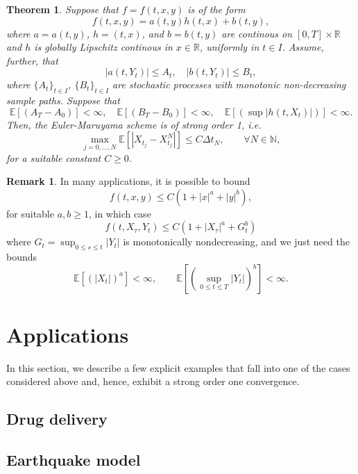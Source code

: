 \documentclass[reqno,12pt]{amsart}
\theoremstyle{plain}%
\newtheorem{thm}{Theorem}[section]
\theoremstyle{definition}
\newtheorem{rmk}{Remark}[section]
\begin{document}
\begin{thm}
  Suppose that $f=f(t, x, y)$ is of the form
  \begin{equation}
    \label{lineareqform}
    f(t, x, y) = a(t, y)h(t, x) + b(t, y),
  \end{equation}
  where $a=a(t, y)$, $h=(t, x)$, and $b=b(t, y)$ are continous on $[0, T]\times \mathbb{R}$ and $h$ is globally Lipschitz continous in $x\in\mathbb{R}$, uniformly in $t\in I$. Assume, further, that
  \[
    |a(t, Y_t)| \leq A_t, \quad |b(t, Y_t)| \leq B_t,
  \]
  where $\{A_t\}_{t\in I}$, $\{B_t\}_{t\in I}$ are stochastic processes with monotonic non-decreasing sample paths. Suppose that
  \[
    \mathbb{E}[(A_T - A_0)] < \infty, \quad \mathbb{E}[(B_T - B_0)] < \infty, \quad \mathbb{E}[(\sup |h(t, X_t)|)] < \infty.
  \]
  Then, the Euler-Maruyama scheme is of strong order 1, i.e.
  \begin{equation}
    \max_{j=0, \ldots, N}\mathbb{E}\left[ \left| X_{t_j} - X_{t_j}^N \right| \right] \leq C \Delta t_N, \qquad \forall N \in \mathbb{N},
  \end{equation}
  for a suitable constant $C \geq 0$.
\end{thm}

\begin{rmk}
    In many applications, it is possible to bound
    $$
        f(t, x, y) \leq C(1 + |x|^a + |y|^b),
    $$
    for suitable $a, b \geq 1$, in which case
    $$
        f(t, X_\tau, Y_t) \leq C(1 + |X_\tau|^a + G_t^b)
    $$
    where $G_t = \sup_{0 \leq s \leq t} |Y_t|$ is monotonically nondecreasing, and we just need the bounds
    $$
    \mathbb{E}[(|X_t|)^a] < \infty, \qquad \mathbb{E}[(\sup_{0\leq t \leq T} |Y_t|)^b] < \infty.
    $$
\end{rmk}

\section{Applications}

In this section, we describe a few explicit examples that fall into one of the cases considered above and, hence, exhibit a strong order one convergence.

\subsection{Drug delivery}

\subsection{Earthquake model}
\end{document}
